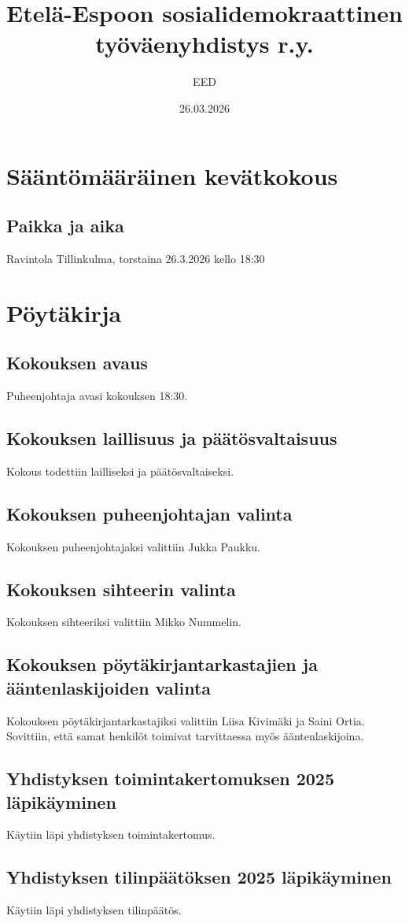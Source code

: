 \documentclass[a4paper,12pt]{article}
\title{Etelä-Espoon sosialidemokraattinen työväenyhdistys r.y.}
\author{EED}
\date{26.03.2026}
\begin{document}
\maketitle
\tableofcontents
\section*{Sääntömääräinen kevätkokous}
\subsection*{Paikka ja aika}
Ravintola Tillinkulma, torstaina 26.3.2026 kello 18:30
\section*{Pöytäkirja}
\subsection{Kokouksen avaus}
Puheenjohtaja avasi kokouksen 18:30.
\subsection{Kokouksen laillisuus ja päätösvaltaisuus}
Kokous todettiin lailliseksi ja päätösvaltaiseksi.
\subsection{Kokouksen puheenjohtajan valinta}
Kokouksen puheenjohtajaksi valittiin Jukka Paukku.
\subsection{Kokouksen sihteerin valinta}
Kokouksen sihteeriksi valittiin Mikko Nummelin.
\subsection{Kokouksen pöytäkirjantarkastajien ja ääntenlaskijoiden valinta}
Kokouksen pöytäkirjantarkastajiksi valittiin Liisa Kivimäki ja Saini Ortia. Sovittiin, että samat henkilöt toimivat tarvittaessa myös ääntenlaskijoina.
\subsection{Yhdistyksen toimintakertomuksen 2025 läpikäyminen}
Käytiin läpi yhdistyksen toimintakertomus.
\subsection{Yhdistyksen tilinpäätöksen 2025 läpikäyminen}
Käytiin läpi yhdistyksen tilinpäätös.
\end{document}
